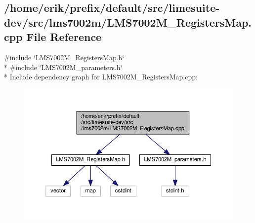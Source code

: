 \subsection{/home/erik/prefix/default/src/limesuite-\/dev/src/lms7002m/\+L\+M\+S7002\+M\+\_\+\+Registers\+Map.cpp File Reference}
\label{LMS7002M__RegistersMap_8cpp}
{\ttfamily \#include \char`\"{}L\+M\+S7002\+M\+\_\+\+Registers\+Map.\+h\char`\"{}}\\*
{\ttfamily \#include \char`\"{}L\+M\+S7002\+M\+\_\+parameters.\+h\char`\"{}}\\*
Include dependency graph for L\+M\+S7002\+M\+\_\+\+Registers\+Map.\+cpp\+:
\nopagebreak
\begin{figure}[H]
\begin{center}
\leavevmode
\includegraphics[width=350pt]{da/d97/LMS7002M__RegistersMap_8cpp__incl}
\end{center}
\end{figure}
